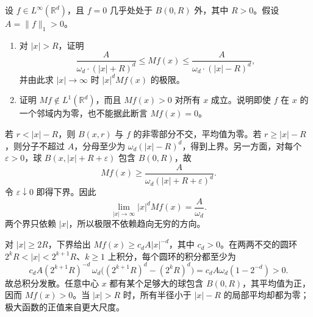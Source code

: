 \begin{exercise}\label{b1:ex:13-maximal-far-field}
设 \(f\in L^\infty(\mathbb R^d)\)，且 \(f=0\) 几乎处处于 \(B(0,R)\) 外，其中 \(R>0\)。假设 \(A=\|f\|_1>0\)。
\begin{enumerate}
\item\label{b1:item:13-far-asymptotic}
对 \(|x|>R\)，证明
\[
 \frac{A}{\omega_d\cdot(|x|+R)^d}\le Mf(x)
 \le\frac{A}{\omega_d\cdot(|x|-R)^d},
\]
并由此求 \(|x|\to\infty\) 时 \(|x|^dMf(x)\) 的极限。
\item\label{b1:item:13-far-nonlocal}
证明 \(Mf\notin L^1(\mathbb R^d)\)，而且 \(Mf(x)>0\) 对所有 \(x\) 成立。说明即使 \(f\) 在 \(x\) 的一个邻域内为零，也不能据此断言 \(Mf(x)=0\)。
\end{enumerate}
\end{exercise}
\begin{solution}
若 \(r<|x|-R\)，则 \(B(x,r)\) 与 \(f\) 的非零部分不交，平均值为零。若 \(r\ge|x|-R\)，则分子不超过 \(A\)，分母至少为 \(\omega_d(|x|-R)^d\)，得到上界。另一方面，对每个 \(\varepsilon>0\)，球 \(B(x,|x|+R+\varepsilon)\) 包含 \(B(0,R)\)，故
\[
 Mf(x)\ge\frac{A}{\omega_d(|x|+R+\varepsilon)^d}.
\]
令 \(\varepsilon\downarrow0\) 即得下界。因此
\[
 \lim_{|x|\to\infty}|x|^dMf(x)=\frac A{\omega_d}.
\]
两个界只依赖 \(|x|\)，所以极限不依赖趋向无穷的方向。

对 \(|x|\ge2R\)，下界给出 \(Mf(x)\ge c_dA|x|^{-d}\)，其中 \(c_d>0\)。在两两不交的圆环 \(2^kR<|x|<2^{k+1}R\)、\(k\ge1\) 上积分，每个圆环的积分都至少为
\[
 c_dA(2^{k+1}R)^{-d}\,
 \omega_d\bigl((2^{k+1}R)^d-(2^kR)^d\bigr)
 =c_dA\omega_d(1-2^{-d})>0.
\]
故总积分发散。任意中心 \(x\) 都有某个足够大的球包含 \(B(0,R)\)，其平均值为正，因而 \(Mf(x)>0\)。当 \(|x|>R\) 时，所有半径小于 \(|x|-R\) 的局部平均却都为零；极大函数的正值来自更大尺度。
\end{solution}

